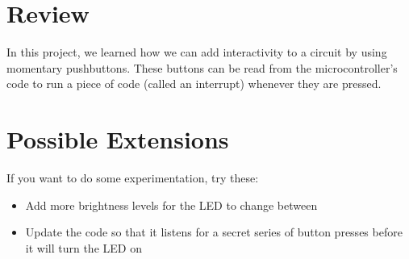 \section{Review}
In this project, we learned how we can add interactivity to a circuit by using momentary pushbuttons.
These buttons can be read from the microcontroller's code to run a piece of code (called an interrupt)
whenever they are pressed.

\section{Possible Extensions}
If you want to do some experimentation, try these:

\begin{itemize}
    \item Add more brightness levels for the LED to change between
    \item Update the code so that it listens for a secret series of button presses before it will turn the LED on
\end{itemize}

